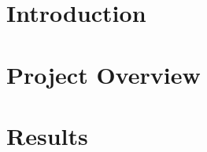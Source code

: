 \documentclass[a4paper,10pt]{article}
\begin{document}

\pagestyle{fancy}
\addtolength{\headheight}{\baselineskip}
\newcommand{\chaptermark}[1]{%
\markboth{#1}%
{}}
\lhead{}
\chead{}

\rhead{\nouppercase{{\sl \leftmark}} \hspace{0.5cm} \makebox[1cm][r]{%
\thepage}}

\cfoot{}


\tableofcontents
\newpage

\section{\label{sec:intro}Introduction}


\section{\label{sec:overview}Project Overview}


\section{\label{sec:results}Results} 


%



%
%
\end{document}
